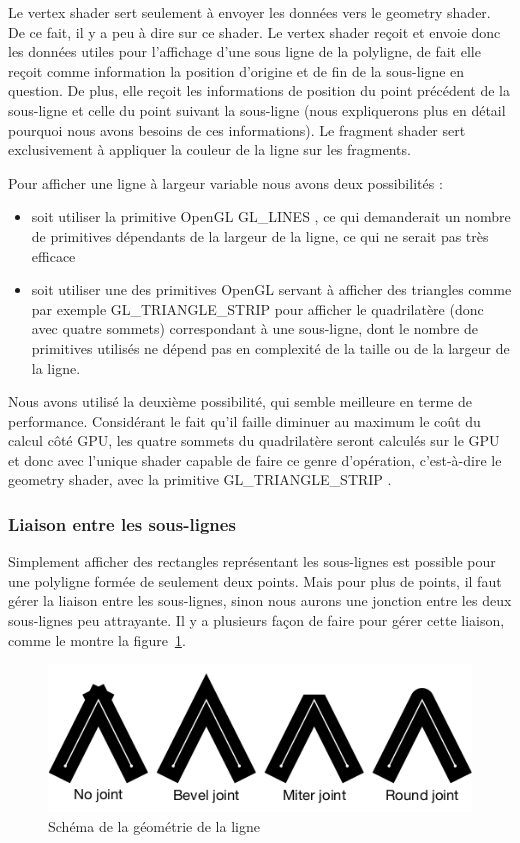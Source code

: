 \documentclass[12pt]{article}
\begin{document}
Le vertex shader sert seulement à envoyer les données vers le geometry shader. De ce fait, il y a peu à dire sur ce shader.
Le vertex shader reçoit et envoie donc les données utiles pour l’affichage
d’une sous ligne de la polyligne, de fait elle reçoit comme information la position
d’origine et de fin de la sous-ligne en question. De plus, elle reçoit les informations
de position du point précédent de la sous-ligne et celle du point suivant la sous-ligne
(nous expliquerons plus en détail pourquoi nous avons besoins de ces informations).
Le fragment shader sert exclusivement à appliquer la couleur de la ligne sur les fragments.

Pour afficher une ligne à largeur variable nous avons deux possibilités :
\begin{itemize}
\item soit utiliser la primitive OpenGL \og GL\_LINES \fg{}, ce qui demanderait un nombre de primitives dépendants de la largeur de la ligne, ce qui ne serait pas très efficace
\item soit utiliser une des primitives OpenGL servant à afficher des triangles comme par exemple \og GL\_TRIANGLE\_STRIP \fg{} pour afficher le quadrilatère (donc avec quatre sommets) correspondant à une sous-ligne, dont le nombre de primitives utilisés ne dépend pas en complexité de la taille ou de la largeur de la ligne.
\end{itemize}

Nous avons utilisé la deuxième possibilité, qui semble meilleure en terme de performance.
Considérant le fait qu’il faille diminuer au maximum le coût du calcul côté GPU, les quatre sommets du quadrilatère seront
calculés sur le GPU et donc avec l’unique shader capable de faire ce genre d’opératio­n, c’est-à-dire le geometry shader, avec
la primitive \og GL\_TRIANGLE\_STRIP \fg{}.

\subsubsection{Liaison entre les sous-lignes}
Simplement afficher des rectangles représentant les sous-lignes est possible pour une polyligne formée de seulement deux points. Mais pour plus de points, il faut gérer la liaison entre les sous-lignes, sinon nous aurons une jonction entre les deux sous-lignes peu attrayante. Il y a plusieurs façon de faire pour gérer cette liaison, comme le montre la figure~\ref{fig:joint}.

\begin{figure}[htp]
  \centering
  \includegraphics[scale=0.8]{images/line-joints}
  \caption{Schéma de la géométrie de la ligne}
  \label{fig:joint}
\end{figure}
\end{document}
